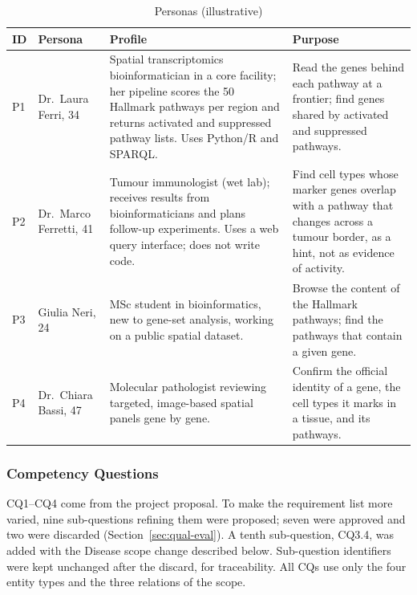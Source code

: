 \begin{table}[htbp]
\centering
\small
\begin{tabularx}{\linewidth}{|l|l|X|X|}
\hline
\textbf{ID} & \textbf{Persona} & \textbf{Profile} & \textbf{Purpose} \\ \hline
P1 & Dr.\ Laura Ferri, 34 & Spatial transcriptomics bioinformatician in a core facility; her pipeline scores the 50 Hallmark pathways per region and returns activated and suppressed pathway lists. Uses Python/R and SPARQL. & Read the genes behind each pathway at a frontier; find genes shared by activated and suppressed pathways. \\ \hline
P2 & Dr.\ Marco Ferretti, 41 & Tumour immunologist (wet lab); receives results from bioinformaticians and plans follow-up experiments. Uses a web query interface; does not write code. & Find cell types whose marker genes overlap with a pathway that changes across a tumour border, as a hint, not as evidence of activity. \\ \hline
P3 & Giulia Neri, 24 & MSc student in bioinformatics, new to gene-set analysis, working on a public spatial dataset. & Browse the content of the Hallmark pathways; find the pathways that contain a given gene. \\ \hline
P4 & Dr.\ Chiara Bassi, 47 & Molecular pathologist reviewing targeted, image-based spatial panels gene by gene. & Confirm the official identity of a gene, the cell types it marks in a tissue, and its pathways. \\ \hline
\end{tabularx}
\caption{Personas (illustrative)}
\label{tab:personas}
\end{table}

\subsubsection{Competency Questions}

CQ1--CQ4 come from the project proposal. To make the requirement list more varied, nine sub-questions refining them were proposed; seven were approved and two were discarded (Section~\ref{sec:qual-eval}). A tenth sub-question, CQ3.4, was added with the Disease scope change described below. Sub-question identifiers were kept unchanged after the discard, for traceability. All CQs use only the four entity types and the three relations of the scope.

